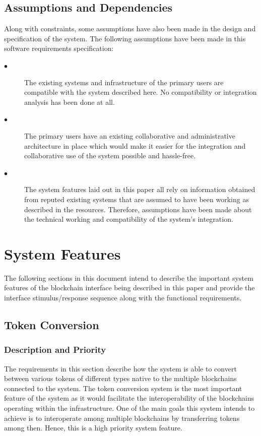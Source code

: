 \documentclass[a4paper,twoside,phd]{BYUPhys}
\begin{document}
\subsection{Assumptions and Dependencies}
Along with constraints, some assumptions have also been made in the design and specification of the system. The following assumptions have been made in this software requirements specification:
\begin{description}
\item[$\bullet$] The existing systems and infrastructure of the primary users are compatible with the system described here. No compatibility or integration analysis has been done at all.
\item[$\bullet$] The primary users have an existing collaborative and administrative architecture in place which would make it easier for the integration and collaborative use of the system possible and hassle-free.
\item[$\bullet$]  The system features laid out in this paper all rely on information obtained from reputed existing systems that are assumed to have been working as described in the resources. Therefore, assumptions have been made about the technical working and compatibility of the system's integration.
\end{description}
\section{System Features \label{sect:chap2sysmodel}}
The following sections in this document intend to describe the important system features of the blockchain interface being described in this paper and provide the interface stimulus/response sequence along with the functional requirements.
\subsection{Token Conversion}
\subsubsection{Description and Priority}
The requirements in this section describe how the system is able to convert between various tokens of different types native to the multiple blockchains connected to the system. The token conversion system is the most important feature of the system as it would facilitate the interoperability of the blockchains operating within the infrastructure. One of the main goals this system intends to achieve is to interoperate among multiple blockchains by transferring tokens among then. Hence, this is a high priority system feature.
\end{document}
